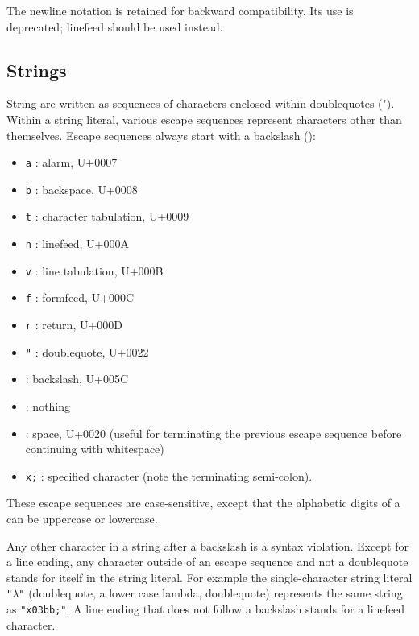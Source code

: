 \begin{note}
  The {\cf\sharpsign\backwhack{}newline} notation is retained for
  backward compatibility.  Its use is deprecated;
  {\cf\sharpsign\backwhack{}linefeed} should be used instead.
\end{note}

\subsection{Strings}

\vest String are written as sequences of characters enclosed within doublequotes
({\cf "}).  Within a string literal, various escape
sequences represent characters other than
themselves.  Escape sequences always start with a backslash (\backwhack{}):

\begin{itemize}
\item{\tt \backwhack{}a} : alarm, U+0007
\item{\tt \backwhack{}b} : backspace, U+0008 
\item{\tt \backwhack{}t} : character tabulation, U+0009 
\item{\tt \backwhack{}n} : linefeed, U+000A 
\item{\tt \backwhack{}v} : line tabulation, U+000B 
\item{\tt \backwhack{}f} : formfeed, U+000C 
\item{\tt \backwhack{}r} : return, U+000D 
\item{\tt \backwhack{}}\verb|"| : doublequote, U+0022 
\item{\tt \backwhack{}\backwhack{}} : backslash, U+005C 
\item{\tt \backwhack{}} : nothing
\item{\tt \backwhack{}} : space, U+0020 (useful for terminating the
  previous escape sequence before continuing with whitespace)
\item{\tt \backwhack{}x;} : specified character (note the
  terminating semi-colon).
\end{itemize}

These escape sequences are case-sensitive, except that the alphabetic
digits of a  can be uppercase or lowercase.

Any other character in a string after a backslash is a syntax violation. Except
for a line ending, any
character outside of an escape sequence and not a doublequote stands
for itself in the string literal. For example the single-character
string literal {\tt "$\lambda$"} (doublequote, a lower case lambda, doublequote)
represents the same string as {\tt "\backwhack{}x03bb;"}.
A line ending that does not follow a backslash stands for a linefeed character.

